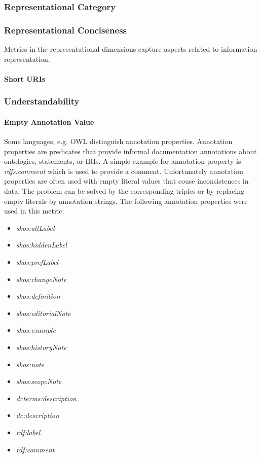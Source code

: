 
\subsubsection{Representational Category}
\label{sec:Representational} 


\subsubsection{Representational Conciseness}

Metrics in the representational dimensions capture aspects related to information representation.


\paragraph{Short URIs}

\subsubsection{Understandability}


\paragraph{Empty Annotation Value}

Some languages, e.g. OWL distinguish annotation properties.
Annotation properties are predicates that provide informal documentation annotations about ontologies, statements, or IRIs. 
A simple example for annotation property is \textit{rdfs:comment} which  is used to provide a comment. 
Unfortunately annotation properties are often used with empty literal values that couse inconsistences in data.
The problem can be solved by the corresponding triples or by replacing empty literals by annotation strings.
The following annotation properties were used in this metric:
\begin{itemize}
\item \textit{skos:altLabel}
\item \textit{skos:hiddenLabel}
\item \textit{skos:prefLabel}
\item \textit{skos:changeNote}
\item \textit{skos:definition}
\item \textit{skos:editorialNote}
\item \textit{skos:example}
\item \textit{skos:historyNote}
\item \textit{skos:note}
\item \textit{skos:scopeNote}
\item \textit{dcterms:description}
\item \textit{dc:description}
\item \textit{rdf:label}
\item \textit{rdf:comment}
\end{itemize}

